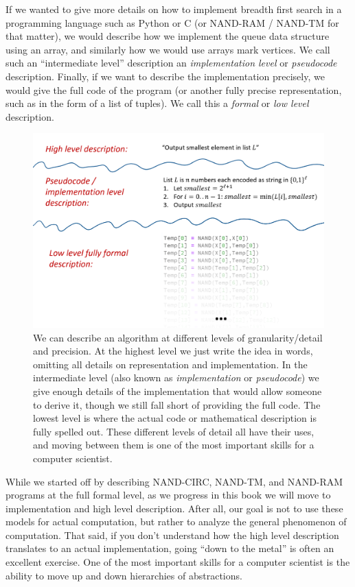 If we wanted to give more details on how to implement breadth first
search in a programming language such as Python or C (or NAND-RAM /
NAND-TM for that matter), we would describe how we implement the queue
data structure using an array, and similarly how we would use arrays
mark vertices. We call such an ``intermediate level'' description an
\emph{implementation level} or \emph{pseudocode} description. Finally,
if we want to describe the implementation precisely, we would give the
full code of the program (or another fully precise representation, such
as in the form of a list of tuples). We call this a \emph{formal} or
\emph{low level} description.


\begin{figure}
\centering
\includegraphics[width=\textwidth, height=0.25\paperheight, keepaspectratio]{../figure/levelsofdescription.png}
\caption{We can describe an algorithm at different levels of
granularity/detail and precision. At the highest level we just write the
idea in words, omitting all details on representation and
implementation. In the intermediate level (also known as
\emph{implementation} or \emph{pseudocode}) we give enough details of
the implementation that would allow someone to derive it, though we
still fall short of providing the full code. The lowest level is where
the actual code or mathematical description is fully spelled out. These
different levels of detail all have their uses, and moving between them
is one of the most important skills for a computer scientist.}
\label{levelsdescfig}
\end{figure}

While we started off by describing NAND-CIRC, NAND-TM, and NAND-RAM
programs at the full formal level, as we progress in this book we will
move to implementation and high level description. After all, our goal
is not to use these models for actual computation, but rather to analyze
the general phenomenon of computation. That said, if you don't
understand how the high level description translates to an actual
implementation, going ``down to the metal'' is often an excellent
exercise. One of the most important skills for a computer scientist is
the ability to move up and down hierarchies of abstractions.

